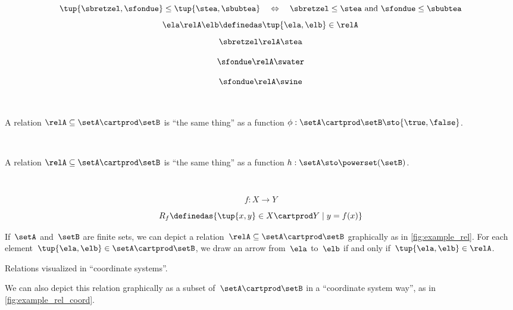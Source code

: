 {\begin{forslides}
        $$ \tup{\sbretzel, \sfondue} \leq \tup{\stea, \sbubtea} \quad \Leftrightarrow \quad \sbretzel \leq \stea \text{ and } \sfondue \leq \sbubtea \label{eq:slides-14}$$
        \begin{equation}
            \ela \relA \elb \definedas \tup{\ela, \elb} \in \relA  \label{eq:slides-15}
        \end{equation}
        $$ \sbretzel \relA \stea \label{eq:slides-16}$$
        
        $$ \sfondue \relA \swater \label{eq:slides-17}$$
        
        $$ \sfondue \relA \swine \label{eq:slides-18}$$
        
        \
        
        A relation $\relA \subseteq \setA \cartprod \setB$ is ``the same thing'' as a function $\phi : \setA \cartprod \setB \sto \{\true, \false\}$.
        
        \
        
        
        A relation $\relA \subseteq \setA \cartprod \setB$ is ``the same thing'' as a function $h : \setA  \sto \powerset (\setB)$.
        
        \
        
        $$
        f : X \to Y
        $$
        
        
        $$
        R_f \definedas \{ \tup{x, y} \in X \cartprod Y \mid y = f(x) \}
        $$
    
    \end{forslides}
}


\begin{marginfigure}
    \centering
    \caption{}
    \label{fig:example_rel}
\end{marginfigure}

If~$\setA$ and~$\setB$ are finite sets, we can depict a relation~$\relA \subseteq \setA \cartprod \setB$ graphically as in \cref{fig:example_rel}.
For each element~$\tup{\ela,\elb} \in \setA \cartprod \setB$, we draw an arrow from~$\ela$ to~$\elb$ if and only if~$\tup{\ela,\elb} \in \relA$.


\begin{marginfigure}
    \centering
    \caption{Relations visualized in ``coordinate systems''.}
    \label{fig:example_rel_coord}
\end{marginfigure}

We can also depict this relation graphically as a subset of~$\setA \cartprod \setB$ in a ``coordinate system way'', as in \cref{fig:example_rel_coord}.

